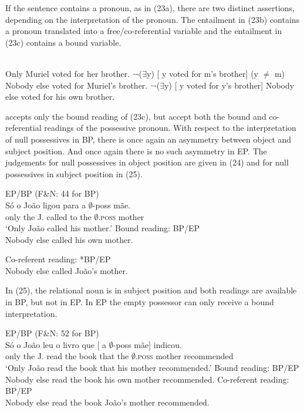 \documentclass[output=paper]{langsci/langscibook}
\begin{document}
If the sentence contains a pronoun, as in (23a), there are two distinct assertions, depending on the interpretation of the pronoun. The entailment in (23b) contains a pronoun translated into a free/co-referential variable and the entailment in (23c) contains a bound variable.

\ea%
    \citet[98–99]{Horn1969}\label{ex:wein:23}\\
    \ea Only Muriel voted for her brother.
    \ex  ¬(${\exists}$y) [ y voted for m’s brother] (y ${\neq}$ m)  
    \glt Nobody else voted for Muriel’s brother.
    \ex ¬(${\exists}$y) [ y voted for y’s brother]
    \glt Nobody else voted for his own brother.
    \z
\z

\citet[102]{Horn1969} accepts only the bound reading of (23c), but \citet[197]{Boeckx2010} accept both the bound and co-referential readings of the possessive pronoun. With respect to the interpretation of null possessives in BP, there is once again an asymmetry between object and subject position. And once again there is no such asymmetry in EP. The judgements for null possessives in object position are given in (24) and for null possessives in subject position in (25).

\ea%
    EP\slash BP (F\&N: 44 for BP)\label{ex:wein:24}\\
    \ea 
    \gll Só o João ligou para a $\emptyset$-poss mãe.\\
         only the J. called to the $\emptyset$\textsc{.poss} mother\\
    \glt ‘Only João called his mother.’
    \ex Bound reading: BP\slash EP\\Nobody else called his own mother.
    
    \ex Co-referent reading: *BP\slash *EP\\Nobody else called João’s mother.
    \z
\z

In (25), the relational noun is in subject position and both readings are available in BP, but not in EP. In EP the empty possessor can only receive a bound interpretation.

\ea%
    EP\slash BP (F\&N: 52 for BP)\label{ex:wein:25}\\
    \ea 
    \gll Só o João leu o livro que [ a $\emptyset$-poss mãe] indicou.\\
         only the J. read the book that {} the $\emptyset$\textsc{.poss} mother recommended\\
    \glt ‘Only João read the book that his mother recommended.’
    \ex Bound reading: BP\slash EP\\Nobody else read the book his own mother recommended.
    \ex Co-referent reading: BP\slash *EP\\Nobody else read the book João’s mother recommended.
    \z
\z
\end{document}
